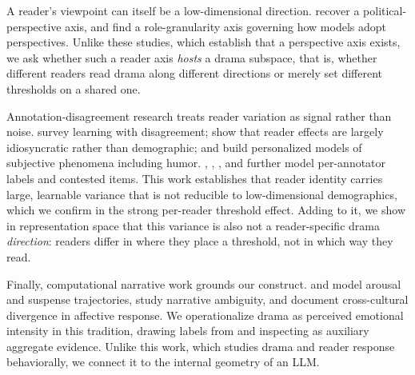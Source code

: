 A reader's viewpoint can itself be a low-dimensional direction. \citet{kim2025political} recover a political-perspective axis, and \citet{qin2026granularity} find a role-granularity axis governing how models adopt perspectives. Unlike these studies, which establish that a perspective axis exists, we ask whether such a reader axis \emph{hosts} a drama subspace, that is, whether different readers read drama along different directions or merely set different thresholds on a shared one.

Annotation-disagreement research treats reader variation as signal rather than noise. \citet{song2025survey} survey learning with disagreement; \citet{orlikowski2025beyond} show that reader effects are largely idiosyncratic rather than demographic; and \citet{kanclerz2022personalized,kanclerz2023pals,bielaniewicz2023chuckles} build personalized models of subjective phenomena including humor. \citet{mehrotra2026multi}, \citet{zhou2025subjectivity}, \citet{mieleszczenko2023capturing}, and \citet{alexeeva2023annotating} further model per-annotator labels and contested items. This work establishes that reader identity carries large, learnable variance that is not reducible to low-dimensional demographics, which we confirm in the strong per-reader threshold effect. Adding to it, we show in representation space that this variance is also not a reader-specific drama \emph{direction}: readers differ in where they place a threshold, not in which way they read.

Finally, computational narrative work grounds our construct. \citet{tian2024narratives} and \citet{christ2024emotional} model arousal and suspense trajectories, \citet{subbiah2025spinning} study narrative ambiguity, and \citet{dai2026cedar} document cross-cultural divergence in affective response. We operationalize drama as perceived emotional intensity in this tradition, drawing labels from \goemotions \citep{demszky2020goemotions} and inspecting \emobank \citep{buechel2017emobank} as auxiliary aggregate evidence. Unlike this work, which studies drama and reader response behaviorally, we connect it to the internal geometry of an LLM.
